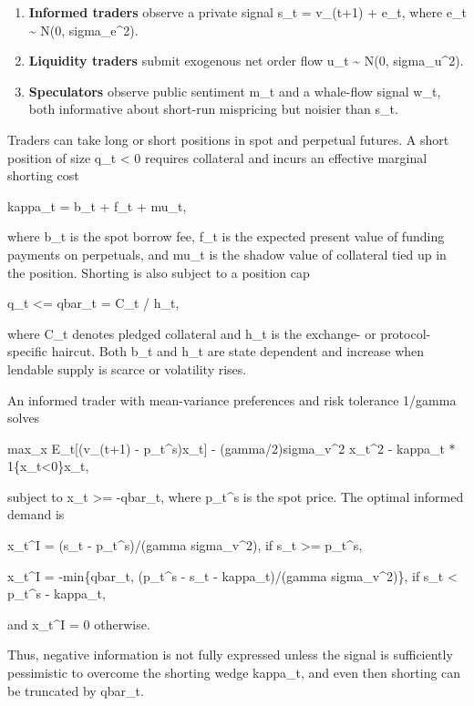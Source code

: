 \documentclass[
]{article}
\providecommand{\tightlist}{%
  \setlength{\itemsep}{0pt}\setlength{\parskip}{0pt}}
\begin{document}
\begin{enumerate}
\def\labelenumi{\arabic{enumi}.}
\tightlist
\item
  \textbf{Informed traders} observe a private signal s\_t = v\_(t+1) +
  e\_t, where e\_t \textasciitilde{} N(0, sigma\_e\^{}2).
\item
  \textbf{Liquidity traders} submit exogenous net order flow u\_t
  \textasciitilde{} N(0, sigma\_u\^{}2).
\item
  \textbf{Speculators} observe public sentiment m\_t and a whale-flow
  signal w\_t, both informative about short-run mispricing but noisier
  than s\_t.
\end{enumerate}

Traders can take long or short positions in spot and perpetual futures.
A short position of size q\_t \textless{} 0 requires collateral and
incurs an effective marginal shorting cost

kappa\_t = b\_t + f\_t + mu\_t,

where b\_t is the spot borrow fee, f\_t is the expected present value of
funding payments on perpetuals, and mu\_t is the shadow value of
collateral tied up in the position. Shorting is also subject to a
position cap

\textbar q\_t\textbar{} \textless= qbar\_t = C\_t / h\_t,

where C\_t denotes pledged collateral and h\_t is the exchange- or
protocol-specific haircut. Both b\_t and h\_t are state dependent and
increase when lendable supply is scarce or volatility rises.

An informed trader with mean-variance preferences and risk tolerance
1/gamma solves

max\_x E\_t{[}(v\_(t+1) - p\_t\^{}s)x\_t{]} - (gamma/2)sigma\_v\^{}2
x\_t\^{}2 - kappa\_t * 1\{x\_t\textless0\}\textbar x\_t\textbar,

subject to x\_t \textgreater= -qbar\_t, where p\_t\^{}s is the spot
price. The optimal informed demand is

x\_t\^{}I = (s\_t - p\_t\^{}s)/(gamma sigma\_v\^{}2), if s\_t
\textgreater= p\_t\^{}s,

x\_t\^{}I = -min\{qbar\_t, (p\_t\^{}s - s\_t - kappa\_t)/(gamma
sigma\_v\^{}2)\}, if s\_t \textless{} p\_t\^{}s - kappa\_t,

and x\_t\^{}I = 0 otherwise.

Thus, negative information is not fully expressed unless the signal is
sufficiently pessimistic to overcome the shorting wedge kappa\_t, and
even then shorting can be truncated by qbar\_t.
\end{document}
